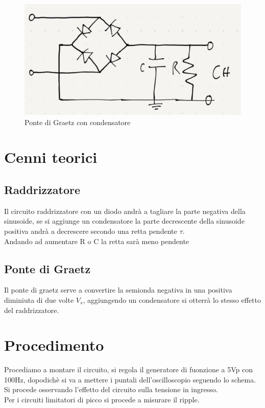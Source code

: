 \documentclass[12pt]{article}
\begin{document}
    \begin{figure}[H]
        \centering
        \includegraphics[scale=0.1]{media/pg.jpg}            
        \caption{Ponte di Graetz con condensatore}
    \end{figure} 
     
 
    \section{Cenni teorici}
    \subsection{Raddrizzatore}
    Il circuito raddrizzatore con un diodo andrà a tagliare la parte negativa della sinusoide, se si aggiunge
    un condensatore la parte decrescente della sinusoide positiva andrà a decrescere secondo una retta pendente $\tau$.\\
    Andando ad aumentare R o C la retta sarà meno pendente
    \subsection{Ponte di Graetz}
    Il ponte di graetz serve a convertire la semionda negativa in una positiva diminiuta di due volte $V_s$, aggiungendo un condensatore si
    otterrà lo stesso effetto del raddrizzatore.
    \section{Procedimento}
    Procediamo a montare il circuito, si regola il generatore di fuonzione a 5Vp con 100Hz, dopodichè si va a mettere i puntali dell'oscilloscopio
    seguendo lo schema. Si procede osservando l'effetto del circuito sulla tensione in ingresso.\\
    Per i circuiti limitatori di picco si procede a misurare il ripple.\\
\end{document}
